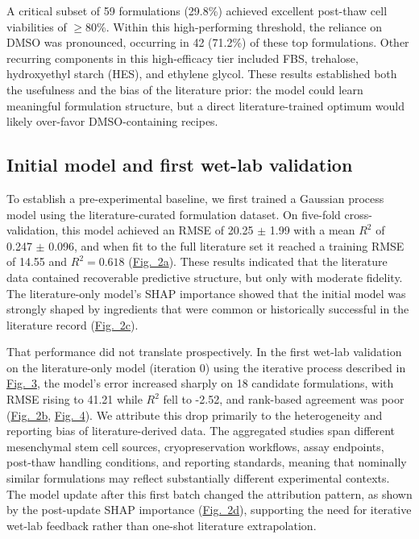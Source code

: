 \documentclass[11pt]{article}
\newcommand{\figref}[2][]{\hyperref[fig:#2]{Fig.~#2#1}}
\begin{document}
A critical subset of 59 formulations (29.8\%) achieved excellent post-thaw cell viabilities of \ensuremath{\geq}80\%. Within this high-performing threshold, the reliance on DMSO was pronounced, occurring in 42 (71.2\%) of these top formulations. Other recurring components in this high-efficacy tier included FBS, trehalose, hydroxyethyl starch (HES), and ethylene glycol. These results established both the usefulness and the bias of the literature prior: the model could learn meaningful formulation structure, but a direct literature-trained optimum would likely over-favor DMSO-containing recipes.

\subsection{Initial model and first wet-lab validation}

To establish a pre-experimental baseline, we first trained a Gaussian process model using the literature-curated formulation dataset. On five-fold cross-validation, this model achieved an RMSE of 20.25 \ensuremath{\pm} 1.99 with a mean $R^2$ of 0.247 \ensuremath{\pm} 0.096, and when fit to the full literature set it reached a training RMSE of 14.55 and $R^2 = 0.618$ (\figref[a]{2}). These results indicated that the literature data contained recoverable predictive structure, but only with moderate fidelity. The literature-only model's SHAP importance showed that the initial model was strongly shaped by ingredients that were common or historically successful in the literature record (\figref[c]{2}).

That performance did not translate prospectively. In the first wet-lab validation on the literature-only model (iteration 0) using the iterative process described in \figref{3}, the model's error increased sharply on 18 candidate formulations, with RMSE rising to 41.21 while $R^2$ fell to -2.52, and rank-based agreement was poor (\figref[b]{2}, \figref{4}). We attribute this drop primarily to the heterogeneity and reporting bias of literature-derived data. The aggregated studies span different mesenchymal stem cell sources, cryopreservation workflows, assay endpoints, post-thaw handling conditions, and reporting standards, meaning that nominally similar formulations may reflect substantially different experimental contexts. The model update after this first batch changed the attribution pattern, as shown by the post-update SHAP importance (\figref[d]{2}), supporting the need for iterative wet-lab feedback rather than one-shot literature extrapolation.
\end{document}
